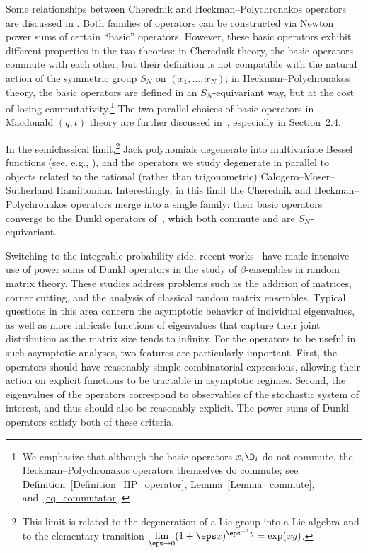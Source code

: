 Some relationships between Cherednik and Heckman--Polychronakos operators are discussed in \cite[Section 5]{sergeev2015jack}. Both families of operators can be constructed via Newton power sums of certain ``basic'' operators. However, these basic operators exhibit different properties in the two theories: in Cherednik theory, the basic operators commute with each other, but their definition is not compatible with the natural action of the symmetric group $S_N$ on $(x_1, \dots, x_N)$; in Heckman--Polychronakos theory, the basic operators are defined in an $S_N$-equivariant way, but at the cost of losing commutativity.\footnote{We emphasize that although the basic operators $x_i\D_i$ do not commute, the Heckman--Polychronakos operators themselves do commute; see Definition~\ref{Definition_HP_operator}, Lemma~\ref{Lemma_commute}, and~\eqref{eq_commutator}.} The two parallel choices of basic operators in Macdonald $(q,t)$ theory are further discussed in~\cite{nazarov2019cherednik}, especially in Section~2.4.

In the semiclassical limit,\footnote{This limit is related to the degeneration of a Lie group into a Lie algebra and to the elementary transition $\lim\limits_{\eps \to 0}(1+\eps x)^{\eps^{-1}y} = \exp(xy)$.} Jack polynomials degenerate into multivariate Bessel functions (see, e.g., \cite[Section 4]{okounkov1997shifted}), and the operators we study degenerate in parallel to objects related to the rational (rather than trigonometric) Calogero--Moser--Sutherland Hamiltonian. Interestingly, in this limit the Cherednik and Heckman--Polychronakos operators merge into a single family: their basic operators converge to the Dunkl operators of~\cite{dunkl1989differential}, which both commute and are $S_N$-equivariant.


Switching to the integrable probability side, recent works~\cite{benaych2022matrix,xu2023rectangular,GXZ2024,KX2024} have made intensive use of power sums of Dunkl operators in the study of $\beta$-ensembles in random matrix theory. These studies address problems such as the addition of matrices, corner cutting, and the analysis of classical random matrix ensembles. Typical questions in this area concern the asymptotic behavior of individual eigenvalues, as well as more intricate functions of eigenvalues that capture their joint distribution as the matrix size tends to infinity. For the operators to be useful in such asymptotic analyses, two features are particularly important. First, the operators should have reasonably simple combinatorial expressions, allowing their action on explicit functions to be tractable in asymptotic regimes. Second, the eigenvalues of the operators correspond to observables of the stochastic system of interest, and thus should also be reasonably explicit. The power sums of Dunkl operators satisfy both of these criteria.

